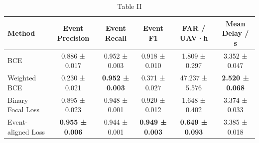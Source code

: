 \begin{table}[htbp]
  \centering
  \caption{Table II}
  \label{tab:table02_loss_comparison_rcs3}
  \begin{tabular}{lccccc}
    \toprule
    Method & Event Precision & Event Recall & Event F1 & FAR / UAV·h & Mean Delay / s \\
    \midrule
    BCE & 0.886 ± 0.017 & 0.952 ± 0.003 & 0.918 ± 0.010 & 1.809 ± 0.297 & 3.352 ± 0.047 \\
    Weighted BCE & 0.230 ± 0.021 & \textbf{0.952 ± 0.003} & 0.371 ± 0.027 & 47.237 ± 5.576 & \textbf{2.520 ± 0.068} \\
    Binary Focal Loss & 0.895 ± 0.023 & 0.948 ± 0.001 & 0.920 ± 0.012 & 1.648 ± 0.402 & 3.374 ± 0.033 \\
    Event-aligned Loss & \textbf{0.955 ± 0.006} & 0.944 ± 0.001 & \textbf{0.949 ± 0.003} & \textbf{0.649 ± 0.093} & 3.385 ± 0.018 \\
    \bottomrule
  \end{tabular}
\end{table}
